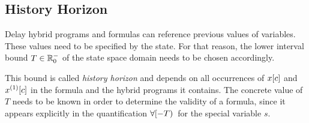     \subsection{History Horizon}
        \label{sec:history-horizon}

        Delay hybrid programs and \ddL formulas can reference previous values of variables. These values need to be specified by the state.
        For that reason, the lower interval bound $T\in\mathbb{R}^-_0$ of the state space domain needs to be chosen accordingly.

        This bound is called \emph{history horizon} and depends on all occurrences of $x[c]$ and $\Dx[c]$ in the formula and the hybrid programs it contains.
        The concrete value of $T$ needs to be known in order to determine the validity of a formula, since it appears explicitly in the quantification $\forall [-T){\,}$ for the special variable $s$.

